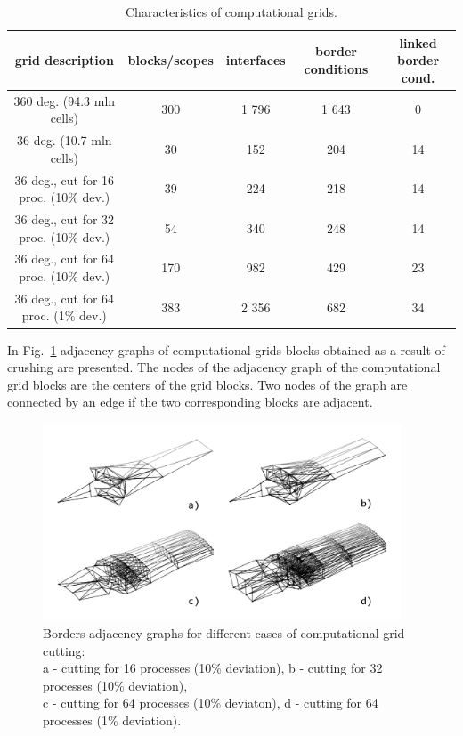 \documentclass[
11pt,%
tightenlines,%
twoside,%
onecolumn,%
nofloats,%
nobibnotes,%
nofootinbib,%
superscriptaddress,%
noshowpacs,%
centertags]%
{revtex4}
\begin{document}
\begin{table}[!h]
\setcaptionmargin{0mm}
\onelinecaptionsfalse
{}
\caption{Characteristics of computational grids.}
\bigskip
\begin{tabular}{|c|c|c|c|c|}
\hline
grid description & blocks/scopes & interfaces & border conditions & linked border cond. \\
\hline
360 deg. (94.3 mln cells) & 300 & 1 796 & 1 643 & 0 \\
36 deg. (10.7 mln cells) & 30 & 152 & 204 & 14 \\
\hline
36 deg., cut for 16 proc. (10\% dev.) & 39 & 224 & 218 & 14 \\
36 deg., cut for 32 proc. (10\% dev.) & 54 & 340 & 248 & 14 \\
36 deg., cut for 64 proc. (10\% dev.) & 170 & 982 & 429 & 23 \\
\hline
36 deg., cut for 64 proc. (1\% dev.) & 383 & 2 356 & 682 & 34 \\
\hline
\end{tabular}
\label{tab:grids}
\end{table}

In Fig.~\ref{fig:g_36_2} adjacency graphs of computational grids blocks obtained as a result of crushing are presented.
The nodes of the adjacency graph of the computational grid blocks are the centers of the grid blocks.
Two nodes of the graph are connected by an edge if the two corresponding blocks are adjacent.

\begin{figure}[h]
\setcaptionmargin{5mm}
\onelinecaptionsfalse
\includegraphics[width=0.95\textwidth]{pics/g_36_2.pdf}
\caption{Borders adjacency graphs for different cases of computational grid cutting: \\ a - cutting for 16 processes (10\% deviation), b - cutting for 32 processes (10\% deviation), \\ c - cutting for 64 processes (10\% deviaton), d - cutting for 64 processes (1\% deviation).}
\label{fig:g_36_2}
\end{figure}
\end{document}
